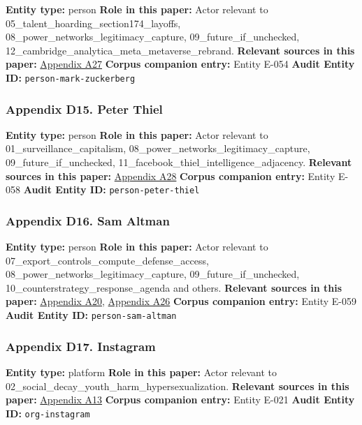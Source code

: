 \documentclass[
  american,
  11pt,
  letterpaper,
]{article}
\begin{document}
\textbf{Entity type:} person \textbf{Role in this paper:} Actor relevant
to 05\_talent\_hoarding\_section174\_layoffs,
08\_power\_networks\_legitimacy\_capture, 09\_future\_if\_unchecked,
12\_cambridge\_analytica\_meta\_metaverse\_rebrand. \textbf{Relevant
sources in this paper:}
\hyperref[ch-10-appendix-a27-inside-mark-zuckerbergs-top-secret-hawaii-compound]{Appendix
A27} \textbf{Corpus companion entry:} Entity E-054 \textbf{Audit Entity
ID:} \texttt{person-mark-zuckerberg}

\subsubsection{Appendix D15. Peter
Thiel}\label{ch-10-appendix-d15-peter-thiel}

\textbf{Entity type:} person \textbf{Role in this paper:} Actor relevant
to 01\_surveillance\_capitalism,
08\_power\_networks\_legitimacy\_capture, 09\_future\_if\_unchecked,
11\_facebook\_thiel\_intelligence\_adjacency. \textbf{Relevant sources
in this paper:}
\hyperref[ch-10-appendix-a28-new-zealand-woos-the-wealthy-with-golden-visa-changes]{Appendix
A28} \textbf{Corpus companion entry:} Entity E-058 \textbf{Audit Entity
ID:} \texttt{person-peter-thiel}

\subsubsection{Appendix D16. Sam
Altman}\label{ch-10-appendix-d16-sam-altman}

\textbf{Entity type:} person \textbf{Role in this paper:} Actor relevant
to 07\_export\_controls\_compute\_defense\_access,
08\_power\_networks\_legitimacy\_capture, 09\_future\_if\_unchecked,
10\_counterstrategy\_response\_agenda and others. \textbf{Relevant
sources in this paper:}
\hyperref[ch-10-appendix-a20-openais-proposals-for-the-us-ai-action-plan]{Appendix
A20},
\hyperref[ch-10-appendix-a26-sam-altman-s-manifest-destiny]{Appendix
A26} \textbf{Corpus companion entry:} Entity E-059 \textbf{Audit Entity
ID:} \texttt{person-sam-altman}

\subsubsection{Appendix D17.
Instagram}\label{ch-10-appendix-d17-instagram}

\textbf{Entity type:} platform \textbf{Role in this paper:} Actor
relevant to 02\_social\_decay\_youth\_harm\_hypersexualization.
\textbf{Relevant sources in this paper:}
\hyperref[ch-10-appendix-a13-unfiltered-how-teens-engage-in-body-image-and-shaming-discussions-via-instagram-direct-messages-dms]{Appendix
A13} \textbf{Corpus companion entry:} Entity E-021 \textbf{Audit Entity
ID:} \texttt{org-instagram}
\end{document}
